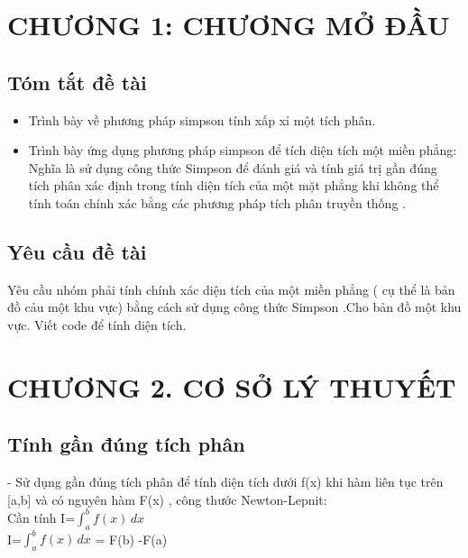 \documentclass[14pt,a4paper]{article}
\begin{document}
\section*{CHƯƠNG 1: CHƯƠNG MỞ ĐẦU}
\setcounter{section}{1}
\subsection{Tóm tắt đề tài}
\begin{itemize}
\item \fontsize{13pt}{2pt}\selectfont Trình bày về phương pháp simpson tính xấp xỉ một tích phân. \\
\item \fontsize{13pt}{2pt}\selectfont Trình bày ứng dụng phương pháp simpson để tích diện tích một miền phẳng: Nghĩa là sử dụng công thức Simpson để đánh giá và tính giá trị gần đúng tích phân xác định trong tính diện tích của một mặt phẳng khi không thể tính toán chính xác bằng các phương pháp tích phân truyền thống . \\
\end{itemize}
\subsection{Yêu cầu đề tài}
\fontsize{13pt}{2pt}\selectfont           Yêu cầu nhóm phải tính chính xác diện tích của  một miền phẳng ( cụ thể là bản đồ cảu một khu vực) bằng cách sử dụng công thức Simpson .Cho bản đồ một khu vực. Viết code để tính diện tích.\\
\newpage
\section*{CHƯƠNG 2. CƠ SỞ LÝ THUYẾT}
\subsection{Tính gần đúng tích phân}
\fontsize{13pt}{2pt}\selectfont - Sử dụng gần đúng tích phân để tính diện tích dưới f(x) khi hàm liên tục trên [a,b] và có nguyên hàm F(x) , công thước Newton-Lepnit: \\
\hspace*{1cm} \fontsize{13pt}{2pt}\selectfont Cần tính I=${\displaystyle \int_{a}^{b}f(x)\,dx}$\\
\hspace*{1cm} \fontsize{13pt}{2pt}\selectfont I=${\displaystyle \int_{a}^{b}f(x)\,dx}$ = F(b) -F(a)\\
\end{document}

